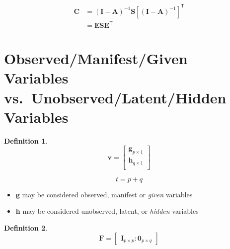 \documentclass[
]{book}
\providecommand{\tightlist}{%
  \setlength{\itemsep}{0pt}\setlength{\parskip}{0pt}}
\theoremstyle{definition}
\newtheorem{definition}{Definition}[chapter]
\theoremstyle{definition}
\theoremstyle{definition}
\theoremstyle{remark}
\begin{document}
\begin{equation}
  \begin{split}
    \mathbf{C}
    &=
    \left( \mathbf{I} - \mathbf{A} \right)^{-1}
    \mathbf{S}
    \left[ \left( \mathbf{I} - \mathbf{A} \right)^{-1} \right]^{\mathsf{T}} \\
    &=
    \mathbf{E} \mathbf{S} \mathbf{E}^{\mathsf{T}}
  \end{split}
\end{equation}

\hypertarget{observedmanifestgiven-variables-vs.-unobservedlatenthidden-variables}{%
\section{Observed/Manifest/Given Variables vs.~Unobserved/Latent/Hidden Variables}\label{observedmanifestgiven-variables-vs.-unobservedlatenthidden-variables}}

\begin{definition}
\protect\hypertarget{def:unnamed-chunk-6}{}{\label{def:unnamed-chunk-6} }\begin{equation}
  \mathbf{v}
  =
  \begin{bmatrix}
    \mathbf{g}_{p \times 1} \\
    \mathbf{h}_{q \times 1} \\
  \end{bmatrix}
\end{equation}

\begin{equation}
  t = p + q
\end{equation}
\end{definition}

\begin{itemize}
\tightlist
\item
  \(\mathbf{g}\) may be considered observed, manifest or \emph{given} variables
\item
  \(\mathbf{h}\) may be considered unobserved, latent, or \emph{hidden} variables
\end{itemize}

\begin{definition}
\protect\hypertarget{def:unnamed-chunk-7}{}{\label{def:unnamed-chunk-7} }\begin{equation}
  \mathbf{F}
  =
  \begin{bmatrix}
    \mathbf{I}_{p \times p} : \mathbf{0}_{p \times q}
  \end{bmatrix}
\end{equation}
\end{definition}
\end{document}
